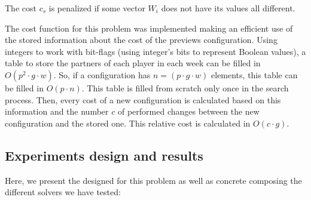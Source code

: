 The cost $c_s$ is penalized if some vector $W_i$ does not have its values all different.


The cost function for this problem was implemented making an efficient use of the stored information about the cost of the previews configuration. Using integers to work with bit-flags (\ie using integer's bits to represent Boolean values), a table to store the partners of each player in each week can be filled in $O\left(p^2\cdot g \cdot w\right)$. So, if a configuration has $n = (p\cdot g \cdot w)$ elements, this table can be filled in $O\left(p\cdot n\right)$. This table is filled from scratch only once in the search process. Then, every cost of a new configuration is calculated based on this information and the number $c$ of performed changes between the new configuration and the stored one. This relative cost is calculated in $O\left(c\cdot g\right)$.

\subsection{Experiments design and results}

Here, we present the \as{} designed for this problem as well as concrete \oms{} composing the different solvers we have tested:

